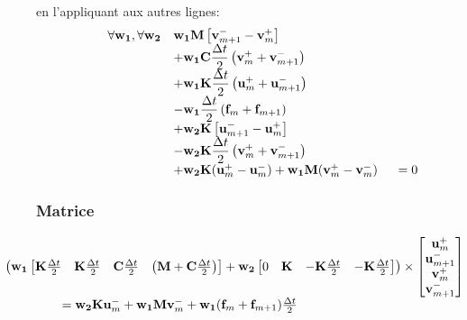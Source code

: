 \documentclass[12pt,a4paper]{report}
\begin{document}
en l'appliquant aux autres lignes:
\begin{equation}
\begin{array}{r l}
	\forall \mathbf{w_1},\forall \mathbf{w_2}
	&\displaystyle
	 \mathbf{w_1} \mathbf{M}
		\left[ \mathbf{v}_{m+1}^- - \mathbf{v}_m^+ \right]
	\\ 
	  &\displaystyle
	  +\mathbf{w_1} \mathbf{C} \frac{\Delta t}{2}	  
	     \left(
	  		\mathbf{v}_m^+ + \mathbf{v}_{m+1}^-
		 \right)
	\\
	  &\displaystyle
	  +\mathbf{w_1} \mathbf{K} \frac{\Delta t}{2}
		\left(
			\mathbf{u}_m^+ + \mathbf{u}_{m+1}^- 
		\right)
	\\
	  &\displaystyle
	  -\mathbf{w_1} \frac{\Delta t}{2}
		\left( 
			\mathbf{f}_m + \mathbf{f}_{m+1} 
		\right) 
	\\
	  &+\displaystyle
	    \mathbf{w_2} \mathbf{K}
		\left[ \mathbf{u}_{m+1}^- - \mathbf{u}_m^+ \right]
	\\
	  &\displaystyle	    
	    -\mathbf{w_2} \mathbf{K} \frac{\Delta t}{2}
			\left(
				\mathbf{v}_m^+ + \mathbf{v}_{m+1}^- 
			\right)
	\\
	  &+ \mathbf{w_2} \mathbf{K} (\mathbf{u}_m^+ - \mathbf{u}_m^-)
	   +  \mathbf{w_1} \mathbf{M}(\mathbf{v}_m^+ - \mathbf{v}_m^-)
	~~~~=0
\end{array}
\end{equation}

\subsubsection{Matrice}
\begin{equation}
\label{PremiereEquation}
\begin{array}{l l}
		\!\!\!\!\!\!\!\!\!\!\!\!\!\!\!\!\!\!
		\!\!\!\!\!\!\!\!\! 
		 \left(
		 \mathbf{w_1}
		\begin{bmatrix}	   
		   \mathbf{K}\frac{\Delta t}{2} 
		   &\mathbf{K}\frac{\Delta t}{2} 
		   &\mathbf{C}\frac{\Delta t}{2}
		   &\left( \mathbf{M}+\mathbf{C}\frac{\Delta t}{2} \right) \\ 
		\end{bmatrix}
		+ \mathbf{w_2}
		\begin{bmatrix}	   
		   0 
		   &\mathbf{K} 
		   &-\mathbf{K}\frac{\Delta t}{2} 
		   &-\mathbf{K}\frac{\Delta t}{2} \\ 
		\end{bmatrix}
		\right)
		\times 
		\begin{bmatrix}
		   \mathbf{u}_m^+  		\\
		   \mathbf{u}_{m+1}^-  	\\
		   \mathbf{v}_m^+  		\\
		   \mathbf{v}_{m+1}^-  	\\
		\end{bmatrix}
	\\
		=  \mathbf{w_2} \mathbf{K} \mathbf{u}_m^- 
		 + \mathbf{w_1} \mathbf{M} \mathbf{v}_m^-
		 + \mathbf{w_1} (\mathbf{f}_m + \mathbf{f}_{m+1})  \frac{\Delta t}{2}
	
\end{array}
\end{equation}
\end{document}
